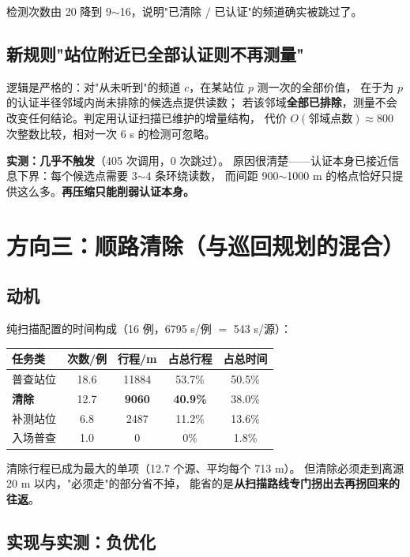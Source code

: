 检测次数由 20 降到 9$\sim$16，说明"已清除 / 已认证"的频道确实被跳过了。

\subsection{新规则"站位附近已全部认证则不再测量"}

逻辑是严格的：对"从未听到"的频道 $c$，在某站位 $p$ 测一次的全部价值，
在于为 $p$ 的认证半径邻域内尚未排除的候选点提供读数；
若该邻域\textbf{全部已排除}，测量不会改变任何结论。判定用认证扫描已维护的增量结构，
代价 $O(\text{邻域点数})\approx800$ 次整数比较，相对一次 6 s 的检测可忽略。

\textbf{实测：几乎不触发}（405 次调用，0 次跳过）。
原因很清楚——认证本身已接近信息下界：每个候选点需要 3$\sim$4 条环绕读数，
而间距 900$\sim$1000 m 的格点恰好只提供这么多。\textbf{再压缩只能削弱认证本身。}

\section{方向三：顺路清除（与巡回规划的混合）}

\subsection{动机}

纯扫描配置的时间构成（16 例，6795 s/例 $=$ 543 s/源）：

\begin{center}
\begin{tabular}{lcccc}
\toprule
任务类 & 次数/例 & 行程/m & 占总行程 & 占总时间 \\ \midrule
普查站位 & 18.6 & 11884 & 53.7\% & 50.5\% \\
\textbf{清除} & 12.7 & \textbf{9060} & \textbf{40.9\%} & 38.0\% \\
补测站位 & 6.8 & 2487 & 11.2\% & 13.6\% \\
入场普查 & 1.0 & 0 & 0\% & 1.8\% \\
\bottomrule
\end{tabular}
\end{center}

清除行程已成为最大的单项（12.7 个源、平均每个 713 m）。
但清除必须走到离源 20 m 以内，"必须走"的部分省不掉，
能省的是\textbf{从扫描路线专门拐出去再拐回来的往返}。

\subsection{实现与实测：负优化}

